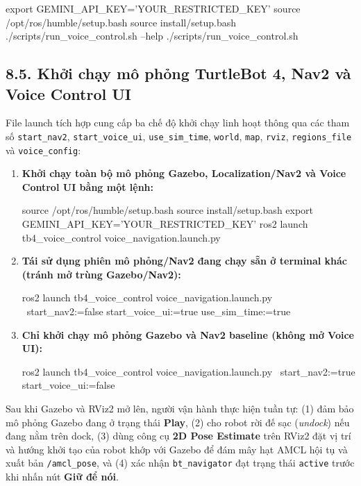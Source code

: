 \begin{svcode}
export GEMINI_API_KEY='YOUR_RESTRICTED_KEY'
source /opt/ros/humble/setup.bash
source install/setup.bash
./scripts/run_voice_control.sh --help
./scripts/run_voice_control.sh
\end{svcode}

\subsection*{8.5. Khởi chạy mô phỏng TurtleBot 4, Nav2 và Voice Control UI}

File launch tích hợp  cung cấp ba chế độ khởi chạy linh hoạt thông qua các tham số \texttt{start\_nav2}, \texttt{start\_voice\_ui}, \texttt{use\_sim\_time}, \texttt{world}, \texttt{map}, \texttt{rviz}, \texttt{regions\_file} và \texttt{voice\_config}:

\begin{enumerate}[leftmargin=1.2cm]
  \item \textbf{Khởi chạy toàn bộ mô phỏng Gazebo, Localization/Nav2 và Voice Control UI bằng một lệnh:}
\begin{svcode}
source /opt/ros/humble/setup.bash
source install/setup.bash
export GEMINI_API_KEY='YOUR_RESTRICTED_KEY'
ros2 launch tb4_voice_control voice_navigation.launch.py
\end{svcode}

  \item \textbf{Tái sử dụng phiên mô phỏng/Nav2 đang chạy sẵn ở terminal khác (tránh mở trùng Gazebo/Nav2):}
\begin{svcode}
ros2 launch tb4_voice_control voice_navigation.launch.py \
  start_nav2:=false start_voice_ui:=true use_sim_time:=true
\end{svcode}

  \item \textbf{Chỉ khởi chạy mô phỏng Gazebo và Nav2 baseline (không mở Voice UI):}
\begin{svcode}
ros2 launch tb4_voice_control voice_navigation.launch.py \
  start_nav2:=true start_voice_ui:=false
\end{svcode}
\end{enumerate}

Sau khi Gazebo và RViz2 mở lên, người vận hành thực hiện tuần tự: (1) đảm bảo mô phỏng Gazebo đang ở trạng thái \textbf{Play}, (2) cho robot rời đế sạc (\textit{undock}) nếu đang nằm trên dock, (3) dùng công cụ \textbf{2D Pose Estimate} trên RViz2 đặt vị trí và hướng khởi tạo của robot khớp với Gazebo để đám mây hạt AMCL hội tụ và xuất bản \texttt{/amcl\_pose}, và (4) xác nhận \texttt{bt\_navigator} đạt trạng thái \texttt{active} trước khi nhấn nút \textbf{Giữ để nói}.
